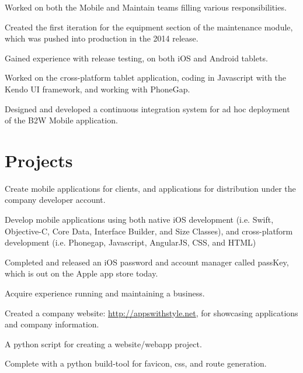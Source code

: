 \documentclass[]{resume}
\begin{document}
\begin{minipage}[t]{0.66\textwidth}
\begin{tightemize} \item Worked on both the Mobile and Maintain teams filling various responsibilities. \item Created the first iteration for the equipment section of the maintenance module, which was pushed into production in the 2014 release. \item Gained experience with release testing, on both iOS and Android tablets. \item Worked on the cross-platform tablet application, coding in Javascript with the Kendo UI framework, and working with PhoneGap. \item Designed and developed a continuous integration system for ad hoc deployment of the B2W Mobile application. \end{tightemize}
\sectionsep


\section{Projects}
\begin{tightemize} \item Create mobile applications for clients, and applications for distribution under the company developer account. \item Develop mobile applications using both native iOS development (i.e. Swift, Objective-C, Core Data, Interface Builder, and Size Classes), and cross-platform development (i.e. Phonegap, Javascript, AngularJS, CSS, and HTML) \item Completed and released an iOS password and account manager called passKey, which is out on the Apple app store today.\item Acquire experience running and maintaining a business. \item Created a company website: \url{http://appswithstyle.net}, for showcasing applications and company information. \end{tightemize}
\sectionsep

\fontsize{10pt}{12pt}\selectfont {} \normalfont
\begin{tightemize} \item A python script for creating a website/webapp project. \item Complete with a python build-tool for favicon, css, and route generation. \end{tightemize}
\sectionsep

\end{minipage}
\end{document}
